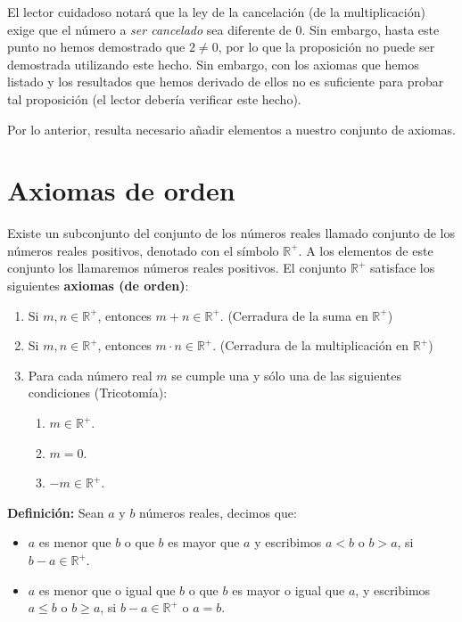\documentclass[11pt]{article}
\newcommand{\R}{\mathbb{R}}
\begin{document}
El lector cuidadoso notará que la ley de la cancelación (de la multiplicación) exige que el número a \textit{ser cancelado} sea diferente de $0$. Sin embargo, hasta este punto no hemos demostrado que $2\neq 0$, por lo que la proposición no puede ser demostrada utilizando este hecho. Sin embargo, con los axiomas que hemos listado y los resultados que hemos derivado de ellos no es suficiente para probar tal proposición (el lector debería verificar este hecho).

Por lo anterior, resulta necesario añadir elementos a nuestro conjunto de axiomas.

\section*{Axiomas de orden}

Existe un subconjunto del conjunto de los números reales llamado conjunto de los números reales positivos, denotado con el símbolo $\R^+$. A los elementos de este conjunto los llamaremos números reales positivos. El conjunto $\R^+$ satisface los siguientes \textbf{axiomas (de orden)}:
%
\begin{enumerate}[label=O\arabic*)]
\item Si $m, n \in \R^+$, entonces $m + n \in \R^+$. (Cerradura de la suma en $\R^+$)
\item Si $m, n \in \R^+$, entonces $m \cdot n \in \R^+$. (Cerradura de la multiplicación en $\R^+$)
\item Para cada número real $m$ se cumple una y sólo una de las siguientes condiciones (Tricotomía):
    \begin{enumerate}[label=\roman*)]
    \item $m \in \R^+$.
    \item $m = 0$.
    \item $-m \in \R^+$.\
    \end{enumerate}
\end{enumerate}

\textbf{Definición:} Sean $a$ y $b$ números reales, decimos que:%
%
\begin{itemize}
    \item $a$ es menor que $b$ o que $b$ es mayor que $a$ y escribimos $a<b$ o $b>a$, si $b-a \in \R^+$.
    \item $a$ es menor que o igual que $b$ o que $b$ es mayor o igual que $a$, y escribimos $a \leq b$ o $b \geq a$, si $b - a \in \R^+$ o $a = b$.
\end{itemize}
\end{document}
